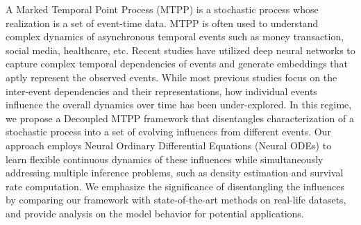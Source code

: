 A Marked Temporal Point Process (MTPP) is a stochastic process whose realization is a set of event-time data. 
MTPP is often used to understand complex dynamics of asynchronous temporal events such as money transaction, social media, healthcare, etc. 
Recent studies have utilized deep neural networks to capture complex temporal dependencies of events and generate embeddings that aptly represent the observed events. 
While most previous studies focus on the inter-event dependencies and their representations,
how individual events influence the overall dynamics over time has been under-explored. 
In this regime, we propose a Decoupled MTPP framework that disentangles characterization of a stochastic process into a set of evolving influences from different events. 
Our approach employs Neural Ordinary Differential Equations (Neural ODEs) \cite{bib:node} to learn flexible continuous dynamics of these influences while simultaneously addressing multiple inference problems, 
such as density estimation and survival rate computation. 
We emphasize the significance of disentangling the influences by comparing our framework with state-of-the-art methods on real-life datasets, 
and provide analysis on the model behavior for potential applications.